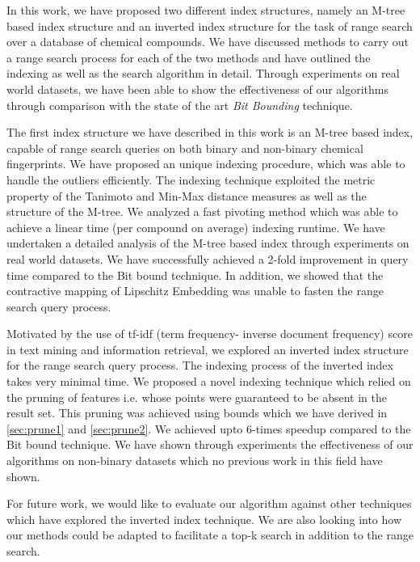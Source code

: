 %
%
In this work, we have proposed two different index structures, namely an M-tree based index structure and an inverted index structure for the task of range search over a database of chemical compounds. We have discussed methods to carry out a range search process for each of the two methods and have outlined the indexing as well as the search algorithm in detail. Through experiments on real world datasets, we have been able to show the effectiveness of our algorithms through comparison with the state of the art\textit{ Bit Bounding} technique.

The first index structure we have described in this work is an  M-tree based index, capable of range search queries on both binary and non-binary chemical fingerprints. We have proposed an unique indexing procedure, which was able to handle the outliers efficiently. The indexing technique exploited the metric property of the Tanimoto and Min-Max distance measures as well as the structure of the M-tree. We analyzed a fast pivoting method which was able to achieve a linear time (per compound on average) indexing runtime. We have undertaken a detailed analysis of the M-tree based index through experiments on real world datasets. We have successfully achieved a 2-fold improvement in query time compared to the Bit bound technique. In addition, we showed that the contractive mapping of Lipschitz Embedding was unable to fasten the range search query process. 

Motivated by the use of tf-idf (term frequency- inverse document frequency) score in text mining and information retrieval, we explored an inverted index structure for the range search query process. The indexing process of the inverted index takes very minimal time. We proposed a novel indexing technique which relied on the pruning of features i.e. whose points were guaranteed to be absent in the result set. This pruning was achieved using bounds which we have derived in \autoref{sec:prune1} and \autoref{sec:prune2}. We achieved upto 6-times speedup compared to the Bit bound technique. We have shown through experiments the effectiveness of our algorithms on non-binary datasets which no previous work in this field have shown. 
 
For future work, we would like to evaluate our algorithm against other techniques which have explored the inverted index technique. We are also looking into how our methods could be adapted to facilitate a top-k search in addition to the range search. 

